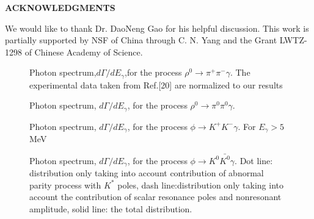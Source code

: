 \begin{center}
{\bf ACKNOWLEDGMENTS}
\end{center}
We would like to thank Dr. DaoNeng Gao for his helpful discussion.
This work is partially supported by NSF of China through C. N. Yang
and the Grant LWTZ-1298 of Chinese Academy of Science.



\newpage
\begin{figure}[]
\centering
{}
\caption{Photon spectrum,$d\Gamma/dE_\gamma$,for the process $\rho^0
\to \pi^+ \pi^- \gamma$. The experimental data taken from Ref.[20]
 are normalized to our results} 
\label{figure:1(a)}
\end{figure}

\begin{figure}[]
   \centering
   \caption{Photon spectrum, $d\Gamma/dE_\gamma$, for the process $\rho^0
            \rightarrow \pi^0\pi^0\gamma$.}
   \label{figure:1(b)}
\end{figure}

\begin{figure}[]
   \centering
   \caption{Photon spectrum, $d\Gamma/dE_\gamma$, for the process $\phi
            \rightarrow K^+ K^-\gamma$. For $E_\gamma>5$MeV}
   \label{figure:1(c)}
\end{figure}


\begin{figure}[]
   \centering
   \caption{Photon spectrum, $d\Gamma/dE_\gamma$, for the process
$\phi \rightarrow K^0\bar{K^0}\gamma$. Dot line: distribution only taking
into account contribution of abnormal parity process with $K^*$ poles,
dash line:distribution only taking into account the contribution of scalar
resonance poles and nonresonant amplitude, solid line: the total
distribution.}
   \label{figure:1(d)}
\end{figure}


